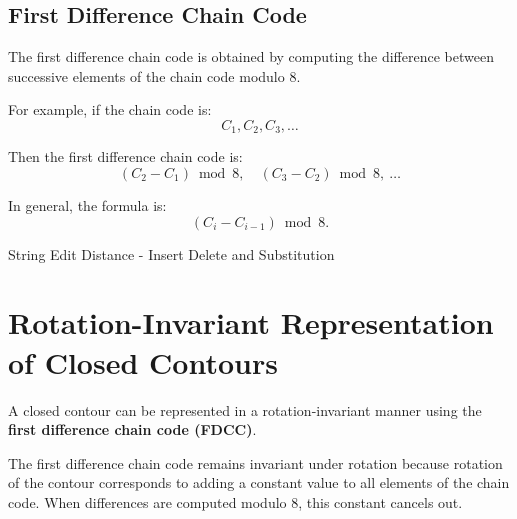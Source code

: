 \documentclass[11pt]{article}
\theoremstyle{definition}
\begin{document}
\subsection{First Difference Chain Code}

The first difference chain code is obtained by computing the difference between successive elements of the chain code modulo 8.

For example, if the chain code is:
\[
C_1, C_2, C_3, \ldots
\]

Then the first difference chain code is:
\[
(C_2 - C_1) \bmod 8,\quad (C_3 - C_2) \bmod 8,\ \ldots
\]

In general, the formula is:
\[
(C_i - C_{i-1}) \bmod 8.
\]

% 











String Edit Distance - Insert Delete and Substitution


\section{Rotation-Invariant Representation of Closed Contours}

A closed contour can be represented in a rotation-invariant manner using the \textbf{first difference chain code (FDCC)}.

The first difference chain code remains invariant under rotation because rotation of the contour corresponds to adding a constant value to all elements of the chain code. When differences are computed modulo 8, this constant cancels out.
\end{document}
